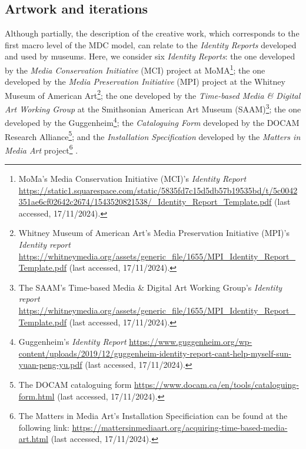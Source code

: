 \subsection{Artwork and iterations}
Although partially, the description of the creative work, which corresponds to the first macro level of the MDC model, can relate to the \textit{Identity Reports} developed and used by museums. Here, we consider six \textit{Identity Reports}: the one developed by the \textit{Media Conservation Initiative} (MCI) project at MoMA\footnote{MoMa’s Media Conservation Initiative (MCI)'s \textit{Identity Report} \url{https://static1.squarespace.com/static/5835fd7c15d5db57b19535bd/t/5c0042351ae6cf02642c2674/1543520821538/_Identity_Report_Template.pdf} (last accessed, 17/11/2024).}; the one developed by the \textit{Media Preservation Initiative} (MPI) project at the Whitney Museum of American Art\footnote{Whitney Museum of American Art’s Media Preservation Initiative (MPI)'s \textit{Identity report} \url{https://whitneymedia.org/assets/generic_file/1655/MPI_Identity_Report_Template.pdf} (last accessed, 17/11/2024).}; the one developed by the \textit{Time-based Media \& Digital Art Working Group} at the Smithsonian American Art Museum (SAAM)\footnote{ The SAAM’s Time-based Media \& Digital Art Working Group's \textit{Identity report} \url{https://whitneymedia.org/assets/generic_file/1655/MPI_Identity_Report_Template.pdf} (last accessed, 17/11/2024).}; the one developed by the Guggenheim\footnote{Guggenheim’s \textit{Identity Report} \url{https://www.guggenheim.org/wp-content/uploads/2019/12/guggenheim-identity-report-cant-help-myself-sun-yuan-peng-yu.pdf} (last accessed, 17/11/2024).}; the \textit{Cataloguing Form} developed by the DOCAM Research Alliance\footnote{The DOCAM cataloguing form \url{https://www.docam.ca/en/tools/cataloguing-form.html} (last accessed, 17/11/2024).}; and the \textit{Installation Specification} developed by the \textit{Matters in Media Art} project\footnote{The Matters in Media Art's Installation Specificiation can be found at the following link: \url{https://mattersinmediaart.org/acquiring-time-based-media-art.html} (last accessed, 17/11/2024).}
.\\
